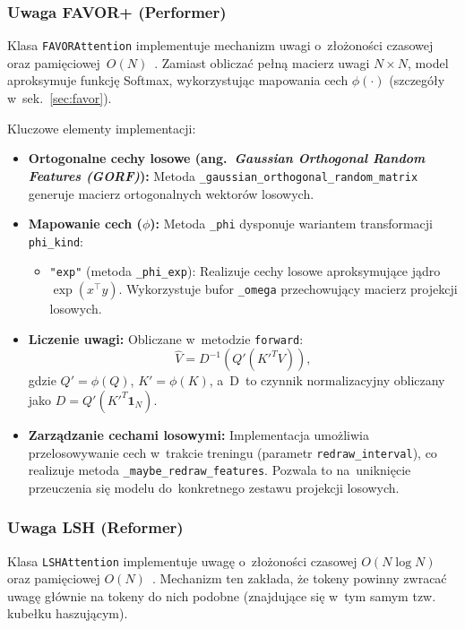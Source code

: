 \documentclass[a4paper,11pt,twoside]{report}
\theoremstyle{definition}
\begin{document}
\subsubsection{Uwaga FAVOR+ (Performer)}
Klasa \texttt{FAVORAttention} implementuje mechanizm uwagi o~złożoności czasowej oraz pamięciowej~$O(N)$~\cite{choromanski2021rethinking}. Zamiast obliczać pełną macierz uwagi $N \times N$, model aproksymuje funkcję Softmax, wykorzystując mapowania cech $\phi(\cdot)$ (szczegóły w~sek.~\ref{sec:favor}).

Kluczowe elementy implementacji:
\begin{itemize}
    \item \textbf{Ortogonalne cechy losowe (ang.\ \emph{Gaussian Orthogonal Random Features (GORF)}):} Metoda \texttt{\_gaussian\_orthogonal\_random\_matrix} generuje macierz ortogonalnych wektorów losowych.
    
    \item \textbf{Mapowanie cech ($\phi$):} Metoda \texttt{\_phi} dysponuje wariantem transformacji 
    \texttt{phi\_kind}:
    \begin{itemize}
        \item \texttt{"exp"} (metoda \texttt{\_phi\_exp}): Realizuje cechy losowe aproksymujące jądro $\exp(x^\top y)$. Wykorzystuje bufor \texttt{\_omega} przechowujący macierz projekcji losowych.
    \end{itemize}

    \item \textbf{Liczenie uwagi:} Obliczane w~metodzie \texttt{forward}:
    \begin{equation}
        \hat{V} = D^{-1} (Q' (K'^T V)),
    \end{equation}
    gdzie $Q' = \phi(Q)$, $K' = \phi(K)$, a~D~to czynnik normalizacyjny obliczany jako $D = Q' (K'^T \mathbf{1}_N)$.
    
    \item \textbf{Zarządzanie cechami losowymi:} Implementacja umożliwia przelosowywanie cech w~trakcie treningu (parametr \texttt{redraw\_interval}), co realizuje metoda \texttt{\_maybe\_redraw\_features}. Pozwala to na~uniknięcie przeuczenia się modelu do~konkretnego zestawu projekcji losowych.
\end{itemize}

\subsubsection{Uwaga LSH (Reformer)}
Klasa \texttt{LSHAttention} implementuje uwagę o~złożoności czasowej $O(N \log N)$ oraz pamięciowej $O(N)$~\cite{Kitaev2020Reformer:}. Mechanizm ten zakłada, że tokeny powinny zwracać uwagę głównie na tokeny do nich podobne (znajdujące się w~tym samym tzw. kubełku haszującym).
\end{document}
